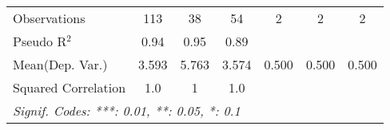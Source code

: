\begin{tabular}{lcccccc}
   Observations                                               & 113          & 38             & 54             & 2    & 2    & 2\\  
   Pseudo R$^2$                                               & 0.94         & 0.95           & 0.89           &      &      & \\  
Mean(Dep. Var.) & 3.593 & 5.763 & 3.574 & 0.500 & 0.500 & 0.500 \\
   Squared Correlation                                        & 1.0          & 1              & 1.0            &      &      & \\  
   \midrule \midrule
   \multicolumn{7}{l}{\emph{Signif. Codes: ***: 0.01, **: 0.05, *: 0.1}}\\
\end{tabular}
\par\endgroup
